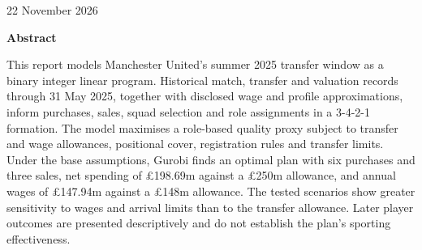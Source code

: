 \documentclass[12pt,a4paper]{article}
\begin{document}
\begin{titlepage}
\vspace{0.3cm}
22 November 2026\par

\vspace{0.5cm}

\begin{minipage}{0.96\textwidth}
\setlength{\parindent}{0pt}
\setlength{\parskip}{0pt}

{\centering\bfseries Abstract\par}
\vspace{0.18cm}

This report models Manchester United's summer 2025 transfer window
as a binary integer linear program. Historical match, transfer and
valuation records through 31 May 2025, together with disclosed wage
and profile approximations, inform purchases, sales, squad selection
and role assignments in a 3-4-2-1 formation. The model maximises a
role-based quality proxy subject to transfer and wage allowances,
positional cover, registration rules and transfer limits. Under the
base assumptions, Gurobi finds an optimal plan with six purchases
and three sales, net spending of \pounds 198.69m against a
\pounds 250m allowance, and annual wages of \pounds 147.94m against
a \pounds 148m allowance. The tested scenarios show greater
sensitivity to wages and arrival limits than to the transfer
allowance. Later player outcomes are presented descriptively
and do not establish the plan's sporting effectiveness.
\par

\end{minipage}

\end{titlepage}

\setcounter{page}{2}
\begin{singlespace}
\tableofcontents
\end{singlespace}
\clearpage









\begin{singlespace}


\end{singlespace}

\clearpage
{}
\appendix





\end{document}

